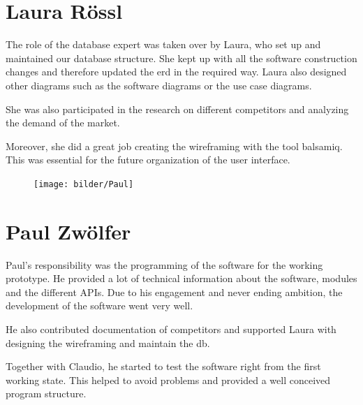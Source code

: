 \section*{Laura Rössl}
The role of the database expert was taken over by Laura, who set up and maintained our database structure. She kept up with all the software construction changes and therefore updated the \gls{erd} in the required way. Laura also designed other diagrams such as the software diagrams or the use case diagrams. 

She was also participated in the research on different competitors and analyzing the demand of the market.

Moreover, she did a great job creating the wireframing with the tool balsamiq. This was essential for the future organization of the user interface.

\begin{figure}
	\texttt{[image: bilder/Paul]}
\end{figure}
\section*{Paul Zwölfer}
Paul's responsibility was the programming of the software for the working prototype. He provided a lot of technical information about the software, modules and the different APIs. Due to his engagement and never ending ambition, the development of the software went very well.

He also contributed documentation of competitors and supported Laura with designing the wireframing and maintain the \gls{db}.

Together with Claudio, he started to test the software right from the first working state. This helped to avoid problems and provided a well conceived program structure.